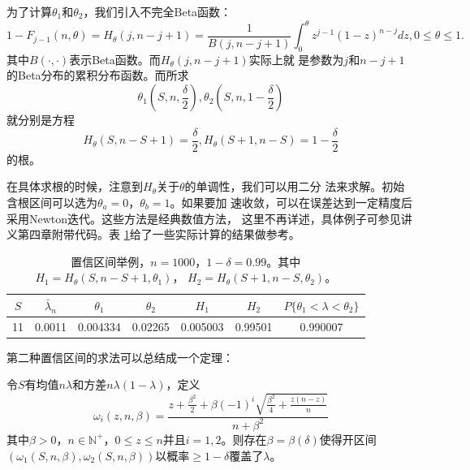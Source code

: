 为了计算$\theta_1$和$\theta_2$，我们引入不完全Beta函数\cite{Abramowitz1970Handbook}：
\begin{equation}
  1 - F_{j - 1}(n, \theta) = H_\theta(j, n - j + 1) = \frac{1}{B(j, n
    - j + 1)}\int_0^\theta z^{j - 1}(1 - z)^{n - j} dz, 0 \leq \theta \leq 1.
  \label{eq::incomplete_beta}
\end{equation}
其中$B(\cdot, \cdot)$表示Beta函数。而$H_\theta(j, n - j + 1)$实际上就
是参数为$j$和$n - j + 1$的Beta分布的累积分布函数。而所求
$$
\theta_1(S, n, \frac{\delta}{2}), \theta_2(S, n, 1 - \frac{\delta}{2})
$$
就分别是方程
$$
H_\theta(S, n - S + 1) = \frac{\delta}{2},
H_\theta(S + 1, n - S) = 1 - \frac{\delta}{2}
$$
的根。

在具体求根的时候，注意到$H_\theta$关于$\theta$的单调性，我们可以用二分
法来求解。初始含根区间可以选为$\theta_a = 0$，$\theta_b = 1$。如果要加
速收敛，可以在误差达到一定精度后采用Newton迭代。这些方法是经典数值方法，
这里不再详述，具体例子可参见讲义第四章附带代码。表
\ref{table::confidence_intervals}给了一些实际计算的结果做参考。

 \begin{table}[!ht]
   \centering
   \caption{置信区间举例，$n = 1000$，$1 - \delta = 0.99$。其中
     $H_1 = H_\theta(S, n - S + 1, \theta_1)$，
     $H_2 = H_\theta(S + 1, n - S, \theta_2)$。}
   \label{table::confidence_intervals}
\begin{tabular}{|c|c|c|c|c|c|c|}
  \hline
  $S$ & $\bar{\lambda}_n$ & $\theta_1$ & $\theta_2$&
  $H_1$&$H_2$&
  $P\{\theta_1 < \lambda < \theta_2\}$\\
  \hline
  11&0.0011&0.004334&0.02265& 0.005003&0.99501&0.990007\\
  \hline
\end{tabular}
\end{table}

第二种置信区间的求法可以总结成一个定理：


\begin{theorem}{}
  令$S$有均值$n \lambda$和方差$n \lambda(1 - \lambda)$，定义
  \begin{equation}
    \omega_i(z, n, \beta) = \frac{z + \frac{\beta^2}{2} +
      \beta(-1)^i\sqrt{\frac{\beta^2}{4} + \frac{z(n - z)}{n}}}{n +
      \beta^2}
    \label{eq::conf_int2}
  \end{equation}
  其中$\beta > 0$，$n \in \mathbb{N}^+$，$0 \leq z \leq n$并且$i = 1,
  2$。则存在$\beta = \beta(\delta)$使得开区间$(\omega_1(S, n, \beta),
  \omega_2(S, n, \beta))$以概率$\geq 1 - \delta$覆盖了$\lambda$。
  \label{thm::conf_int2}
\end{theorem}

